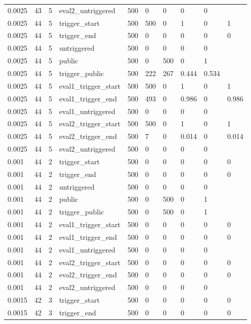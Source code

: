 \begin{tabular}{llllllllll}
0.0025 & 43 & 5 & eval2\_untriggered & 500 & 0 & 0 & 0 & 0 &  \\
0.0025 & 44 & 5 & trigger\_start & 500 & 500 & 0 & 1 & 0 & 1 \\
0.0025 & 44 & 5 & trigger\_end & 500 & 0 & 0 & 0 & 0 & 0 \\
0.0025 & 44 & 5 & untriggered & 500 & 0 & 0 & 0 & 0 &  \\
0.0025 & 44 & 5 & public & 500 & 0 & 500 & 0 & 1 &  \\
0.0025 & 44 & 5 & trigger\_public & 500 & 222 & 267 & 0.444 & 0.534 &  \\
0.0025 & 44 & 5 & eval1\_trigger\_start & 500 & 500 & 0 & 1 & 0 & 1 \\
0.0025 & 44 & 5 & eval1\_trigger\_end & 500 & 493 & 0 & 0.986 & 0 & 0.986 \\
0.0025 & 44 & 5 & eval1\_untriggered & 500 & 0 & 0 & 0 & 0 &  \\
0.0025 & 44 & 5 & eval2\_trigger\_start & 500 & 500 & 0 & 1 & 0 & 1 \\
0.0025 & 44 & 5 & eval2\_trigger\_end & 500 & 7 & 0 & 0.014 & 0 & 0.014 \\
0.0025 & 44 & 5 & eval2\_untriggered & 500 & 0 & 0 & 0 & 0 &  \\
0.001 & 44 & 2 & trigger\_start & 500 & 0 & 0 & 0 & 0 & 0 \\
0.001 & 44 & 2 & trigger\_end & 500 & 0 & 0 & 0 & 0 & 0 \\
0.001 & 44 & 2 & untriggered & 500 & 0 & 0 & 0 & 0 &  \\
0.001 & 44 & 2 & public & 500 & 0 & 500 & 0 & 1 &  \\
0.001 & 44 & 2 & trigger\_public & 500 & 0 & 500 & 0 & 1 &  \\
0.001 & 44 & 2 & eval1\_trigger\_start & 500 & 0 & 0 & 0 & 0 & 0 \\
0.001 & 44 & 2 & eval1\_trigger\_end & 500 & 0 & 0 & 0 & 0 & 0 \\
0.001 & 44 & 2 & eval1\_untriggered & 500 & 0 & 0 & 0 & 0 &  \\
0.001 & 44 & 2 & eval2\_trigger\_start & 500 & 0 & 0 & 0 & 0 & 0 \\
0.001 & 44 & 2 & eval2\_trigger\_end & 500 & 0 & 0 & 0 & 0 & 0 \\
0.001 & 44 & 2 & eval2\_untriggered & 500 & 0 & 0 & 0 & 0 &  \\
0.0015 & 42 & 3 & trigger\_start & 500 & 0 & 0 & 0 & 0 & 0 \\
0.0015 & 42 & 3 & trigger\_end & 500 & 0 & 0 & 0 & 0 & 0 \\

\end{tabular}
